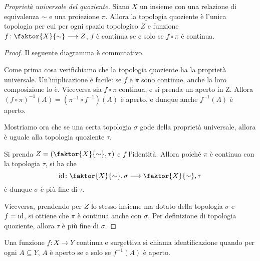 \begin{thm}
    \emph{Propriet\`a universale del quoziente.} Siano $X$ un insieme con una relazione di equivalenza $\sim$ e una proiezione $\pi$. Allora la topologia quoziente \`e l'unica topologia per cui per ogni spazio topologico $Z$ e funzione ${f\colon \faktor{X}{\sim} \longrightarrow Z}$, $f$ \`e continua se e solo se $f \circ \pi$ \`e continua.
\end{thm}
\begin{proof}
    Il seguente diagramma \`e commutativo.

    \begin{center}\end{center}

    Come prima cosa verifichiamo che la topologia quoziente ha la propriet\`a universale. Un'implicazione \`e facile: se $f$ e $\pi$ sono continue, anche la loro composizione lo \`e. Viceversa sia $f\circ \pi$ continua, e si prenda un aperto in Z. Allora $(f \circ \pi)^{-1}(A) = (\pi^{-1} \circ f^{-1})(A)$ \`e aperto, e dunque anche $f^{-1}(A)$ \`e aperto.

    Mostriamo ora che se una certa topologia $\sigma$ gode della propriet\`a universale, allora \`e uguale alla topologia quoziente $\tau$.

    Si prenda $Z = (\faktor{X}{\sim}, \tau)$ e $f$ l'identit\`a. Allora poich\'e $\pi$ \`e continua con la topologia $\tau$, si ha che
    \[
        \id\colon \faktor{X}{\sim}, \sigma \longrightarrow
        \faktor{X}{\sim}, \tau
    \]
    \`e dunque $\sigma$ \`e pi\`u fine di $\tau$.

    Viceversa, prendendo per $Z$ lo stesso insieme ma dotato della topologia $\sigma$ e $f = \operatorname{id}$, si ottiene che $\pi$ \`e continua anche con $\sigma$. Per definizione di topologia quoziente, allora $\tau$ \`e pi\`u fine di $\sigma$.
\end{proof}

\begin{defn}
    Una funzione $f\colon X \longrightarrow Y$ continua e surgettiva si chiama identificazione quando per ogni $A \subseteq Y$, $A$ \`e aperto se e solo se $f^{-1}(A)$ \`e aperto.
\end{defn}


